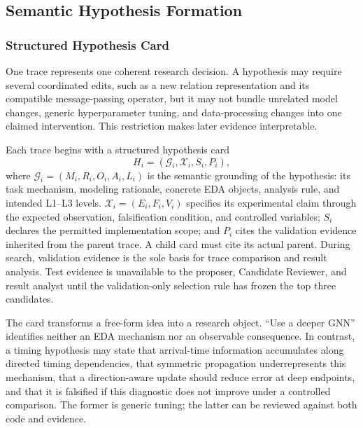 \subsection{Semantic Hypothesis Formation}
\label{sec:hypothesis_protocol}

\subsubsection{Structured Hypothesis Card}

One trace represents one coherent research decision. A hypothesis may require several coordinated edits, such as a new relation representation and its compatible message-passing operator, but it may not bundle unrelated model changes, generic hyperparameter tuning, and data-processing changes into one claimed intervention. This restriction makes later evidence interpretable.

Each trace begins with a structured hypothesis card
\begin{equation}
H_i=(\mathcal{G}_i,\mathcal{X}_i,S_i,P_i),
\label{eq:hypothesis_card}
\end{equation}
where $\mathcal{G}_i=(M_i,R_i,O_i,A_i,L_i)$ is the semantic grounding of the hypothesis: its task mechanism, modeling rationale, concrete EDA objects, analysis rule, and intended L1--L3 levels. $\mathcal{X}_i=(E_i,F_i,V_i)$ specifies its experimental claim through the expected observation, falsification condition, and controlled variables; $S_i$ declares the permitted implementation scope; and $P_i$ cites the validation evidence inherited from the parent trace. A child card must cite its actual parent. During search, validation evidence is the sole basis for trace comparison and result analysis. Test evidence is unavailable to the proposer, Candidate Reviewer, and result analyst until the validation-only selection rule has frozen the top three candidates.

The card transforms a free-form idea into a research object. ``Use a deeper GNN'' identifies neither an EDA mechanism nor an observable consequence. In contrast, a timing hypothesis may state that arrival-time information accumulates along directed timing dependencies, that symmetric propagation underrepresents this mechanism, that a direction-aware update should reduce error at deep endpoints, and that it is falsified if this diagnostic does not improve under a controlled comparison. The former is generic tuning; the latter can be reviewed against both code and evidence.

